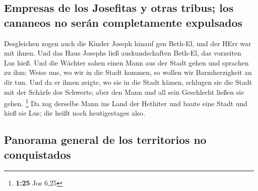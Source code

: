 \hypertarget{empresas-de-los-josefitas-y-otras-tribus-los-cananeos-no-seruxe1n-completamente-expulsados}{%
\subsection{Empresas de los Josefitas y otras tribus; los cananeos no
serán completamente
expulsados}\label{empresas-de-los-josefitas-y-otras-tribus-los-cananeos-no-seruxe1n-completamente-expulsados}}

 Desgleichen zogen auch die Kinder Joseph hinauf gen
Beth-El, und der HErr war mit ihnen.  Und das Haus
Josephs ließ auskundschaften Beth-El, das vorzeiten Lus hieß.
 Und die Wächter sahen einen Mann aus der Stadt gehen und
sprachen zu ihm: Weise uns, wo wir in die Stadt kommen, so wollen wir
Barmherzigkeit an dir tun.  Und da er ihnen zeigte, wo
sie in die Stadt kämen, schlugen sie die Stadt mit der Schärfe des
Schwerts; aber den Mann und all sein Geschlecht ließen sie gehen.
\footnote{\textbf{1:25} Jos 6,25}  Da zog derselbe Mann
ins Land der Hethiter und baute eine Stadt und hieß sie Lus; die heißt
noch heutigestages also.

\hypertarget{panorama-general-de-los-territorios-no-conquistados}{%
\subsection{Panorama general de los territorios no
conquistados}\label{panorama-general-de-los-territorios-no-conquistados}}


